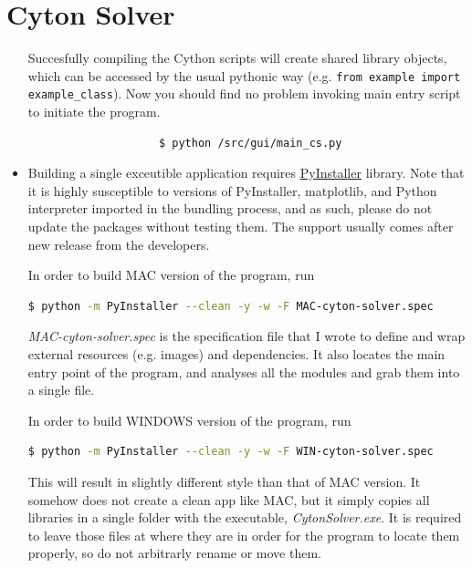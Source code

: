 \documentclass{article}
\newcommand{\enterProblemHeader}[1]{
    }
\newcommand{\exitProblemHeader}[1]{
    }
\newcounter{homeworkProblemCounter} %
\newcommand{\homeworkProblemName}{}
\newenvironment{homeworkProblem}[1][Problem \arabic{homeworkProblemCounter}]{ %
    \stepcounter{homeworkProblemCounter} %
    \renewcommand{\homeworkProblemName}{#1} %
    \section{\homeworkProblemName} %
    \enterProblemHeader{\homeworkProblemName} %
    }{
    \exitProblemHeader{\homeworkProblemName} %
    }
\begin{document}
\begin{homeworkProblem}[Cyton Solver]
\begin{itemize}
                Succesfully compiling the Cython scripts will create shared library objects, which can be accessed by the usual pythonic way (e.g. \verb+from example import example_class+). Now you should find no problem invoking main entry script to initiate the program.
                \begin{lstlisting}
                    $ python /src/gui/main_cs.py
                \end{lstlisting}
                
                \item Building a single exceutible application requires \href{https://www.pyinstaller.org/}{PyInstaller} library. Note that it is highly susceptible to versions of PyInstaller, matplotlib, and Python interpreter imported in the bundling process, and as such, please do not update the packages without testing them. The support usually comes after new release from the developers.
                
                In order to build MAC version of the program, run
                \begin{lstlisting}[language=bash]
        $ python -m PyInstaller --clean -y -w -F MAC-cyton-solver.spec
                \end{lstlisting}
                \textit{MAC-cyton-solver.spec} is the specification file that I wrote to define and wrap external resources (e.g. images) and dependencies. It also locates the main entry point of the program, and analyses all the modules and grab them into a single file.

                In order to build WINDOWS version of the program, run
                \begin{lstlisting}[language=bash]
        $ python -m PyInstaller --clean -y -w -F WIN-cyton-solver.spec
                \end{lstlisting}
                This will result in slightly different style than that of MAC version. It somehow does not create a clean app like MAC, but it simply copies all libraries in a single folder with the executable, \textit{CytonSolver.exe}. It is required to leave those files at where they are in order for the program to locate them properly, so do not arbitrarly rename or move them.
            \end{itemize}
            

\end{homeworkProblem}
\end{document}
